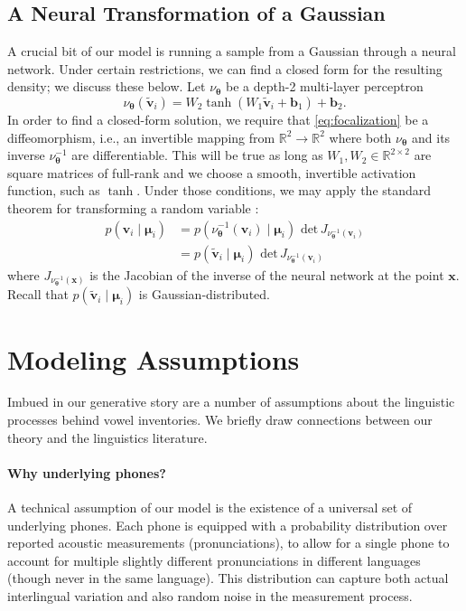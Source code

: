 \documentclass[11pt,a4paper]{article}
\newcommand{\vtheta}{{\boldsymbol \theta}}
\newcommand{\vmu}{{\boldsymbol \mu}}
\newcommand{\vv}{{\mathbf{v}}}
\newcommand{\xx}{{\mathbf{x}}}
\newcommand{\vvtilde}{{\tilde{\mathbf{v}}}}
\newcommand{\NN}{\nu_{\vtheta}}
\begin{document}
\subsection{A Neural Transformation of a Gaussian}\label{sec:transformation}
A crucial bit of our model is running a sample from a Gaussian through
a neural network. Under certain restrictions, we can find a closed
form for the resulting density; we discuss these below.
Let $\NN$ be a depth-2 multi-layer
perceptron
\begin{equation}
 \NN(\mathbf{\vvtilde}_i) = W_2 \tanh \left( W_1 \mathbf{\vvtilde}_i + \mathbf{b}_1 \right) + \mathbf{b}_2.
\end{equation}
In order to find a closed-form solution, we require that \eqref{eq:focalization}
be a diffeomorphism, i.e., an invertible mapping from $\mathbb{R}^2
\to \mathbb{R}^2$ where both $\NN$ and its inverse $\NN^{-1}$ are
differentiable. This will be true as long as $W_1, W_2 \in \mathbb{R}^{2
  \times 2}$ are square matrices of full-rank and we choose a smooth,
invertible activation function, such as $\tanh$.  Under those
conditions, we may apply the standard theorem for transforming a
random variable \citep[see][]{leon2008probability}:
\begin{align}
  p(\vv_i \mid \vmu_i)
  &= p(\NN^{-1}(\vv_i) \mid \vmu_i)\,\, \text{det}\, J_{\NN^{-1}(\vv_i)} \nonumber \\
  &= p(\vvtilde_i \mid \vmu_i)\,\, \text{det}\, J_{\NN^{-1}(\vv_i)} \label{eq:neural-final}
\end{align}
where $J_{\NN^{-1}(\xx)}$ is the Jacobian of the inverse of the neural network at the point $\xx$.
Recall that $p(\vvtilde_i \mid \vmu_i)$ is Gaussian-distributed.

\section{Modeling Assumptions}\label{sec:modeling-assumptions}
Imbued in our generative story are a number
of assumptions about the linguistic processes behind vowel inventories.
We briefly draw connections between our theory and the linguistics literature.

\paragraph{Why underlying phones?}
A technical assumption of our model is the existence of a universal
set of underlying phones.  Each phone is equipped with a probability
distribution over reported acoustic measurements (pronunciations), to
allow for a single phone to account for multiple slightly different
pronunciations in different languages (though never in the same
language).  This distribution can capture both actual interlingual
variation and also random noise in the measurement process.
\end{document}
